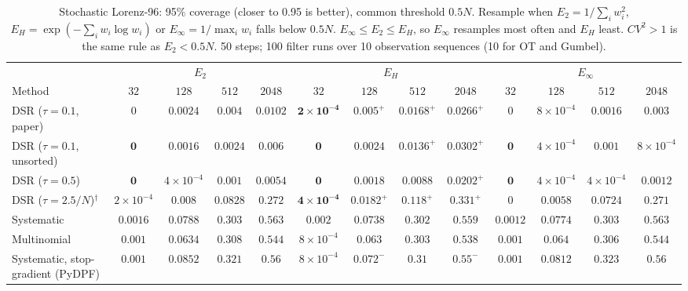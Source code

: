 \begin{table}[ht]
\centering
\small
\caption{Stochastic Lorenz-96: 95\% coverage (closer to 0.95 is better), common threshold $0.5N$. Resample when $E_2=1/\sum_iw_i^2$, $E_H=\exp(-\sum_iw_i\log w_i)$ or $E_\infty=1/\max_iw_i$ falls below $0.5N$. $E_\infty\le E_2\le E_H$, so $E_\infty$ resamples most often and $E_H$ least. $CV^2>1$ is the same rule as $E_2<0.5N$. 50 steps; 100 filter runs over 10 observation sequences (10 for OT and Gumbel).}
\label{tab:trigger-fixed-lorenz96-coverage95}
\begin{adjustbox}{max width=\linewidth}
\begin{tabular}{lcccc|cccc|cccc}
\toprule
 & \multicolumn{4}{c}{$E_2$} & \multicolumn{4}{c}{$E_H$} & \multicolumn{4}{c}{$E_\infty$} \\
\cmidrule(lr){2-5} \cmidrule(lr){6-9} \cmidrule(lr){10-13}
Method & $32$ & $128$ & $512$ & $2048$ & $32$ & $128$ & $512$ & $2048$ & $32$ & $128$ & $512$ & $2048$ \\
\midrule
DSR ($\tau{=}0.1$, paper) & $0$ & $0.0024$ & $0.004$ & $0.0102$ & $\mathbf{2\times10^{-4}}$ & $\mathbf{0.005}^{+}$ & $\mathbf{0.0168}^{+}$ & $\mathbf{0.0266}^{+}$ & $0$ & $8\times10^{-4}$ & $0.0016$ & $0.003$ \\
DSR ($\tau{=}0.1$, unsorted) & $\mathbf{0}$ & $0.0016$ & $0.0024$ & $0.006$ & $\mathbf{0}$ & $\mathbf{0.0024}$ & $\mathbf{0.0136}^{+}$ & $\mathbf{0.0302}^{+}$ & $\mathbf{0}$ & $4\times10^{-4}$ & $0.001$ & $8\times10^{-4}$ \\
DSR ($\tau{=}0.5$) & $\mathbf{0}$ & $4\times10^{-4}$ & $0.001$ & $0.0054$ & $\mathbf{0}$ & $\mathbf{0.0018}$ & $\mathbf{0.0088}$ & $\mathbf{0.0202}^{+}$ & $\mathbf{0}$ & $4\times10^{-4}$ & $4\times10^{-4}$ & $0.0012$ \\
DSR ($\tau{=}2.5/N$)$^\dagger$ & $2\times10^{-4}$ & $0.008$ & $0.0828$ & $0.272$ & $\mathbf{4\times10^{-4}}$ & $\mathbf{0.0182}^{+}$ & $\mathbf{0.118}^{+}$ & $\mathbf{0.331}^{+}$ & $0$ & $0.0058$ & $0.0724$ & $0.271$ \\
\midrule
Systematic & $0.0016$ & $\mathbf{0.0788}$ & $\mathbf{0.303}$ & $\mathbf{0.563}$ & $\mathbf{0.002}$ & $0.0738$ & $0.302$ & $0.559$ & $0.0012$ & $0.0774$ & $0.303$ & $0.563$ \\
Multinomial & $\mathbf{0.001}$ & $0.0634$ & $\mathbf{0.308}$ & $\mathbf{0.544}$ & $8\times10^{-4}$ & $0.063$ & $0.303$ & $0.538$ & $\mathbf{0.001}$ & $\mathbf{0.064}$ & $0.306$ & $\mathbf{0.544}$ \\
Systematic, stop-gradient (PyDPF) & $\mathbf{0.001}$ & $\mathbf{0.0852}$ & $0.321$ & $\mathbf{0.56}$ & $8\times10^{-4}$ & $0.072^{-}$ & $0.31$ & $0.55^{-}$ & $\mathbf{0.001}$ & $0.0812$ & $\mathbf{0.323}$ & $0.56$ \\

\end{tabular}
\end{adjustbox}
\end{table}
